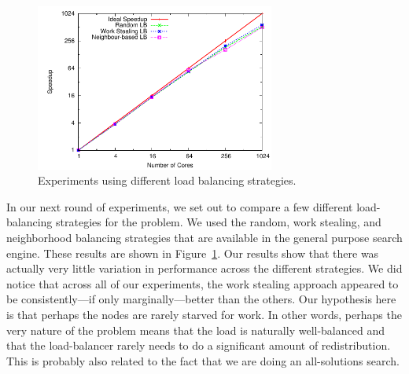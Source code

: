 \documentclass[conference]{IEEEtran}
\begin{document}
\begin{figure}[h]
\centering
\includegraphics[width=0.7\textwidth]{plots/3schemes.pdf}
\caption{Experiments using different load balancing strategies.}
\label{3schemes}
\end{figure}

In our next round of experiments, we set out to compare a few different load-balancing strategies for the problem.  We
used the random, work stealing, and neighborhood balancing strategies that are available in the general purpose search
engine.  These results are shown in Figure~\ref{3schemes}.  Our results show that there was actually very little
variation in performance across the different strategies.  We did notice that across all of our experiments, the work
stealing approach appeared to be consistently---if only marginally---better than the others.  Our hypothesis here is
that perhaps the nodes are rarely starved for work.  In other words, perhaps the very nature of the problem means that
the load is naturally well-balanced and that the load-balancer rarely needs to do a significant amount of
redistribution.  This is probably also related to the fact that we are doing an all-solutions search. 
\end{document}
